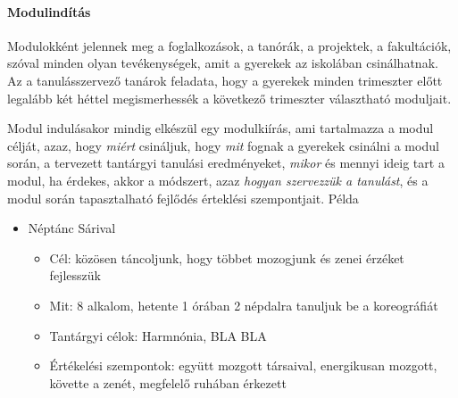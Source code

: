 \paragraph{Modulindítás}\label{modulinduxedtuxe1s}

Modulokként jelennek meg a foglalkozások, a tanórák, a projektek, a
fakultációk, szóval minden olyan tevékenységek, amit a gyerekek az
iskolában csinálhatnak. Az a tanulásszervező tanárok feladata, hogy a
gyerekek minden trimeszter előtt legalább két héttel megismerhessék a
következő trimeszter választható moduljait.

Modul indulásakor mindig elkészül egy modulkiírás, ami tartalmazza a
modul célját, azaz, hogy \emph{miért} csináljuk, hogy \emph{mit} fognak
a gyerekek csinálni a modul során, a tervezett tantárgyi
tanulási eredményeket, \emph{mikor} és mennyi ideig tart a modul, ha érdekes,
akkor a módszert, azaz \emph{hogyan szervezzük a tanulást}, és a modul
során tapasztalható fejlődés érteklési szempontjait. Példa

\begin{itemize}

  \item
        Néptánc Sárival

        \begin{itemize}
          \item
                Cél: közösen táncoljunk, hogy többet mozogjunk és zenei érzéket
                fejlesszük
          \item
                Mit: 8 alkalom, hetente 1 órában 2 népdalra tanuljuk be a
                koreográfiát
          \item
                Tantárgyi célok: Harmnónia, BLA BLA
          \item
                Értékelési szempontok: együtt mozgott társaival, energikusan
                mozgott, követte a zenét, megfelelő ruhában érkezett
        \end{itemize}
\end{itemize}